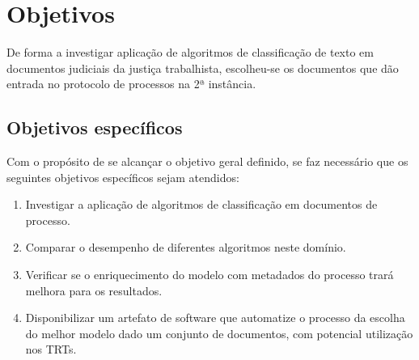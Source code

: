
\section{Objetivos}%
De forma a investigar aplicação de algoritmos de classificação de texto em documentos judiciais da justiça trabalhista, escolheu-se os documentos que dão entrada no protocolo de processos na 2ª instância.


\subsection{Objetivos específicos}%

Com o propósito de se alcançar o objetivo geral definido, se faz necessário que os seguintes objetivos específicos sejam atendidos:
\begin{enumerate}
\item Investigar a aplicação de algoritmos de classificação em documentos de processo.
\item Comparar o desempenho de diferentes algoritmos neste domínio.
\item Verificar se o enriquecimento do modelo com metadados do processo trará melhora para os resultados.
\item Disponibilizar um artefato de software que automatize o processo da escolha do melhor modelo dado um conjunto de documentos, com potencial utilização nos TRTs.
\end{enumerate}




